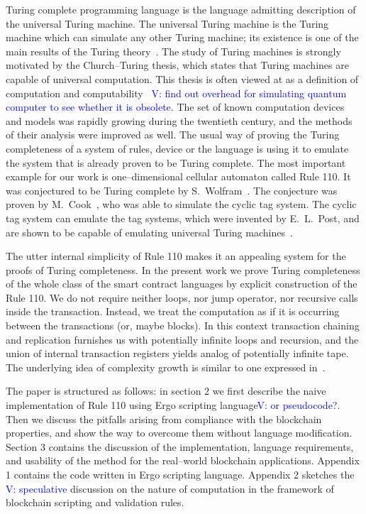 \documentclass[runningheads]{llncs}
\newcommand{\vk}[1]{\textcolor{blue}{V: {#1}}}
\begin{document}
    Turing complete programming language is the language admitting description
    of the universal Turing machine. The universal Turing machine is the Turing
    machine which can simulate any other Turing machine; its existence is one of
    the main results of the Turing theory~\cite{turing1937computable}. The study
    of Turing machines is strongly motivated by the Church--Turing thesis, which
    states that Turing machines are capable of universal computation. This
    thesis is often viewed at as a definition of computation and
    computability~\cite{turing1939systems} \vk{find out overhead for simulating
    quantum computer to see whether it is obsolete}. The set of known
    computation devices and models was rapidly growing during the twentieth
    century, and the methods of their analysis were improved as well. The
    usual way of proving the Turing completeness of a system of rules, device or
    the language is using it to emulate the system that is already proven to be
    Turing complete. The most important example for our work is one--dimensional
    cellular automaton called Rule 110. It was conjectured to be Turing complete
    by S.~Wolfram~\cite{wolfram1986theory}. The conjecture was proven by
    M.~Cook~\cite{cook2004universality}, who was able to simulate the cyclic tag
    system.  The cyclic tag system can emulate the tag systems, which were
    invented by E.~L.~Post, and are shown to be capable of emulating universal
    Turing machines~\cite{post1943formal}.

    The utter internal simplicity of Rule 110 makes it an appealing system for
    the proofs of Turing completeness. In the present work we prove Turing
    completeness of the whole class of the smart contract languages by explicit
    construction of the Rule 110. We do not require neither loops, nor jump
    operator, nor recursive calls inside the transaction. Instead, we treat the
    computation as if it is occurring between the transactions (or, maybe
    blocks). In this context transaction chaining and replication furnishes us
    with potentially infinite loops and recursion, and the union of internal
    transaction registers yields analog of potentially infinite tape. The
    underlying idea of complexity growth is similar to one expressed
    in~\cite{von1951general}.

    The paper is structured as follows: in section 2 we first describe the naive
    implementation of Rule 110 using Ergo scripting language\vk{or pseudocode?}.
    Then we discuss the pitfalls arising from compliance with the blockchain
    properties, and show the way to overcome them without language modification.
    Section 3 contains the discussion of the implementation, language
    requirements, and usability of the method for the real--world blockchain
    applications.  Appendix 1 contains the code written in Ergo scripting
    language.  Appendix 2 sketches the \vk{speculative} discussion on the nature
    of computation in the framework of blockchain scripting and validation
    rules.
\end{document}
